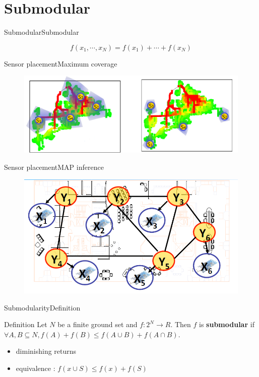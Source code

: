 \section{Submodular}

\begin{frame}{Submodular}{Submodular}
	\begin{block}{}
		\begin{equation}
		\nonumber
		f(x_{1} , \cdots , x_{N} )= f(x_{1}) + \cdots + f(x_{N})
		\end{equation}
	\end{block}
\end{frame}

\begin{frame}{Sensor placement}{Maximum coverage}
\begin{figure}
	\centering
	\includegraphics[width = \textwidth]{./figure/maximum_coverage}
\end{figure}	
\end{frame}

\begin{frame}{Sensor placement}{MAP inference}
\begin{figure}
	\centering
	\includegraphics[width = \textwidth]{./figure/map_inference}
\end{figure}		
\end{frame}

\begin{frame}{Submodularity}{Definition}
\begin{block}{Definition}
Let $ N $ be a finite ground set and $ f : 2^{N} \rightarrow R $. Then $ f $ is \textbf{submodular} if $ \forall A, B \subseteq N,
f(A) + f(B) \leq f(A \cup B) + f(A \cap B). $
\end{block}
\begin{itemize}
\item diminishing returns
\item equivalence : $ f(x \cup S) \leq f(x) + f(S) $
\end{itemize}
\end{frame}

